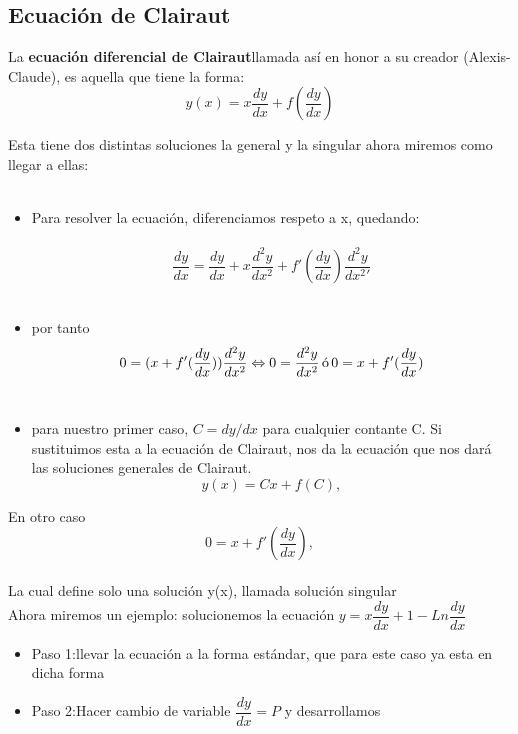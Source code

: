 \documentclass[10pt,a4paper]{article}
\begin{document}
{{{{{{{{{{{{  \subsection{Ecuación de Clairaut}
  
  La \textbf{ecuación diferencial de Clairaut}llamada así en honor a su creador (Alexis-Claude), es aquella que tiene la forma:
\begin{equation}\tag{1}
y(x)=x\dfrac{dy}{dx}+f(\dfrac{dy}{dx})
\end{equation}

Esta tiene dos distintas soluciones la general y la singular ahora miremos como llegar
a ellas:\\\,\\

\begin{itemize}

\item Para resolver la ecuación, diferenciamos respeto a x, quedando:\\\,\\
$$\dfrac{dy}{dx}=\dfrac{dy}{dx}+x\dfrac{d^{2}y}{dx^2}+f'(\dfrac{dy}{dx})\dfrac{d^{2}y}{dx^{2}{'}}$$\\


\item por tanto
$$0=(x+f'(\dfrac{dy}{dx}))\dfrac{d^{2}y}{dx^{2}}\Leftrightarrow 0=\dfrac{d^{2}y}{dx^{2}}\, \textup{ó}\, 0=x+f'(\dfrac{dy}{dx}) $$\\

\item para nuestro primer caso, $C=dy/dx$ para cualquier contante C. Si sustituimos esta a la ecuación de Clairaut, nos da la ecuación que nos dará las soluciones generales de Clairaut.
$$y(x)=Cx+f(C),$$

\end{itemize}

En otro caso
$$0=x+f'(\dfrac{dy}{dx}),$$\\

La cual define solo una solución y(x), llamada solución singular\\

Ahora miremos un ejemplo: solucionemos la ecuación
$y=x\dfrac{dy}{dx}+1-Ln \dfrac{dy}{dx}$\\
 \begin{itemize}
 \item Paso 1:llevar la ecuación a la forma estándar, que para este caso ya esta en dicha forma\\
 \item Paso 2:Hacer cambio de variable $\dfrac{dy}{dx}=P$ y desarrollamos\\
 

\end{itemize}}}}}}}}}}}}}
\end{document}
